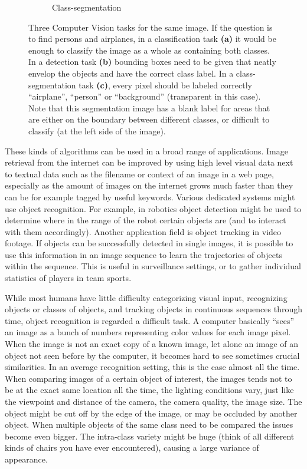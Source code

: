 \begin{figure}[hbt]
\begin{subfigure}[b]{0.3\textwidth}
            \caption{Class-segmentation}
            \label{fig:segmentation}
            \end{subfigure}
    \caption{Three Computer Vision tasks for the same image. If the question is to find persons and airplanes, in a classification task \textbf{(a)} it would be enough to classify the image as a whole as containing both classes. In a detection task \textbf{(b)} bounding boxes need to be given that neatly envelop the objects and have the correct class label. In a class-segmentation task \textbf{(c)}, every pixel should be labeled correctly ``airplane'', ``person'' or ``background'' (transparent in this case). Note that this segmentation image has a blank label for areas that are either on the boundary between different classes, or difficult to classify (at the left side of the image). \cite{pascal-voc-2007}}
    \label{fig:clsdetseg}
\end{figure}

These kinds of algorithms can be used in a broad range of applications. Image retrieval from the internet can be improved by using high level visual data next to textual data such as the filename or context of an image in a web page, especially as the amount of images on the internet grows much faster than they can be for example tagged by useful keywords. Various dedicated systems might use object recognition. For example, in robotics object detection might be used to determine where in the range of the robot certain objects are (and to interact with them accordingly). Another application field is object tracking in video footage. If objects can be successfully detected in single images, it is possible to use this information in an image sequence to learn the trajectories of objects within the sequence. This is useful in surveillance settings, or to gather individual statistics of players in team sports. \cite{benfold2011stable, ekin2003automatic, lipton1998moving}

While most humans have little difficulty categorizing visual input, recognizing objects or classes of objects, and tracking objects in continuous sequences through time, object recognition is regarded a difficult task. A computer basically ``sees'' an image as a bunch of numbers representing color values for each image pixel. When the image is not an exact copy of a known image, let alone an image of an object not seen before by the computer, it becomes hard to see sometimes crucial similarities. In an average recognition setting, this is the case almost all the time. When comparing images of a certain object of interest, the images tends not to be at the exact same location all the time, the lighting conditions vary, just like the viewpoint and distance of the camera, the camera quality, the image size. The object might be cut off by the edge of the image, or may be occluded by another object. When multiple objects of the same class need to be compared the issues become even bigger. The intra-class variety might be huge (think of all different kinds of chairs you have ever encountered), causing a large variance of appearance.

